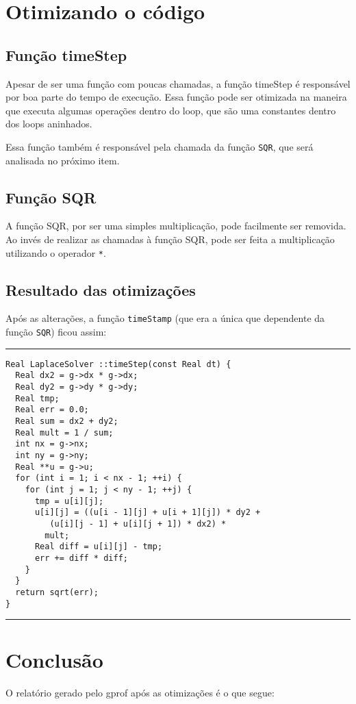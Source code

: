 \documentclass[a4paper,twosidep]{article}
\begin{document}
\section{Otimizando o código}
\label{sec:org5bfeccd}

\subsection{Função timeStep}
\label{sec:org76b5eca}
Apesar de ser uma função com poucas chamadas, a função timeStep é responsável por boa parte do tempo de execução. Essa função pode ser otimizada na maneira que executa algumas operações dentro do loop, que são uma constantes dentro dos loops aninhados.

Essa função também é responsável pela chamada da função \texttt{SQR}, que será analisada no próximo item.

\subsection{Função SQR}
\label{sec:orge0ada24}
A função SQR, por ser uma simples multiplicação, pode facilmente ser removida. Ao invés de realizar as chamadas à função SQR, pode ser feita a multiplicação utilizando o operador \texttt{*}.

\subsection{Resultado das otimizações}
\label{sec:org8324176}
Após as alterações, a função \texttt{timeStamp} (que era a única que dependente da função \texttt{SQR}) ficou assim:

\noindent\rule{\textwidth}{0.5pt}
\begin{verbatim}
Real LaplaceSolver ::timeStep(const Real dt) {
  Real dx2 = g->dx * g->dx;
  Real dy2 = g->dy * g->dy;
  Real tmp;
  Real err = 0.0;
  Real sum = dx2 + dy2;
  Real mult = 1 / sum;
  int nx = g->nx;
  int ny = g->ny;
  Real **u = g->u;
  for (int i = 1; i < nx - 1; ++i) {
    for (int j = 1; j < ny - 1; ++j) {
      tmp = u[i][j];
      u[i][j] = ((u[i - 1][j] + u[i + 1][j]) * dy2 +
		 (u[i][j - 1] + u[i][j + 1]) * dx2) *
		mult;
      Real diff = u[i][j] - tmp;
      err += diff * diff;
    }
  }
  return sqrt(err);
}
\end{verbatim}

\noindent\rule{\textwidth}{0.5pt}

\section{Conclusão}
\label{sec:orgeb56813}
O relatório gerado pelo gprof após as otimizações é o que segue:
\end{document}
